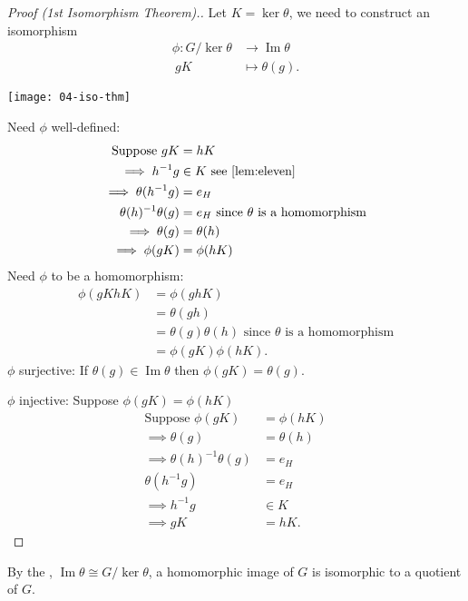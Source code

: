 \begin{proof}[Proof (1st Isomorphism Theorem).]
Let $K = \ker \theta$, we need to construct an isomorphism
\begin{align*}
    \phi : G / \ker \theta &\to \operatorname{Im} \theta \\
    \ gK &\mapsto \theta(g).
\end{align*}

{\centering \texttt{[image: 04-iso-thm]} \par}

Need $\phi$ well-defined:
\begin{align*}
    \text{Suppose } gK &= hK \\
    \implies h^{-1}g &\in K \text{ see \Cref{lem:eleven}} \\
    \implies \theta(h^{-1}g) &= e_H \\
    \theta(h)^{-1} \theta(g) &= e_H \text{ since $\theta$ is a homomorphism} \\
    \implies \theta(g) &= \theta(h) \\
    \implies \phi(gK) &= \phi(hK)
\end{align*}
%
Need $\phi$ to be a homomorphism:
\begin{align*}
    \phi(gK hK) &= \phi(gh K) \\
    &= \theta(gh) \\
    &= \theta(g) \theta(h) \text{ since $\theta$ is a homomorphism} \\
    &= \phi(gK) \phi(hK).
\end{align*}
%
$\phi$ surjective:
If $\theta(g) \in \operatorname{Im} \theta$ then $\phi(gK) = \theta(g)$.

$\phi$ injective:
Suppose $\phi(gK) = \phi(hK)$
\begin{align*}
    \text{Suppose } \phi(gK) &= \phi(hK) \\
    \implies \theta(g) &= \theta(h) \\
    \implies \theta(h)^{-1} \theta(g) &= e_H \\
    \theta(h^{-1}g) &= e_H \\
    \implies h^{-1} g &\in K \\
    \implies gK &= hK. 
\end{align*}
\end{proof}

\begin{remark}
  By the , $\operatorname{Im} \theta \cong G / \ker \theta$, a homomorphic image of $G$ is isomorphic to a quotient of $G$. 
\end{remark}

